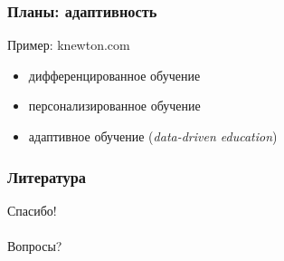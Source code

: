 \documentclass{beamer}
\begin{document}
\begin{frame}\frametitle{Планы: адаптивность}
Пример: knewton.com\cite{knewton_paper}
    \begin{itemize}
    	\item дифференцированное обучение       %
    	\item персонализированное обучение      %
    	\item адаптивное обучение  (\textit{data-driven education})      %
    \end{itemize}
    
    \begin{figure}[H]
    \end{figure} 
\end{frame}


\begin{frame}\frametitle{Литература}
\setmonofont[Mapping=tex-text]{CMU Typewriter Text}


\end{frame}


\begin{frame}
\huge{Спасибо! \\\indent \\\indent Вопросы?}
\end{frame}
\end{document}
